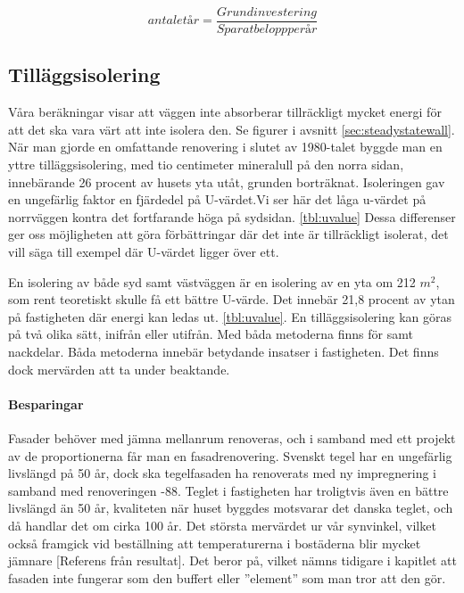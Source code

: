 \begin{equation}
antalet år=\frac{Grundinvestering}{Sparat belopp per år}
\end{equation}

\subsection{Tilläggsisolering}
Våra beräkningar visar att väggen inte absorberar tillräckligt mycket energi för att det ska vara värt att inte isolera den. Se figurer i avsnitt \ref{sec:steadystatewall}.
När man gjorde en omfattande renovering i slutet av 1980-talet byggde man en yttre tilläggsisolering, med tio centimeter mineralull på den norra sidan, \cite{arsredovisning} innebärande 26 procent av husets yta utåt, grunden borträknat. Isoleringen gav en ungefärlig faktor en fjärdedel på U-värdet.Vi ser här det låga u-värdet på norrväggen kontra det fortfarande höga på sydsidan. \ref{tbl:uvalue} Dessa differenser ger oss möjligheten att göra förbättringar där det inte är tillräckligt isolerat, det vill säga till exempel där U-värdet ligger över ett.

En isolering av både syd samt västväggen är en isolering av en yta om 212 $\unit{m^2}$, som rent teoretiskt skulle få ett bättre U-värde. Det innebär 21,8 procent av ytan på fastigheten där energi kan ledas ut. \ref{tbl:uvalue}.
En tilläggsisolering kan göras på två olika sätt, inifrån eller utifrån. Med båda metoderna finns för samt nackdelar. Båda metoderna innebär betydande insatser i fastigheten. Det finns dock mervärden att ta under beaktande. 

\paragraph{Besparingar}
Fasader behöver med jämna mellanrum renoveras, och i samband med ett projekt av de proportionerna får man en fasadrenovering. Svenskt tegel har en ungefärlig livslängd på 50 år\cite{magnus}, dock ska tegelfasaden ha renoverats med ny impregnering i samband med renoveringen -88. Teglet i fastigheten har troligtvis även en bättre livslängd än 50 år, kvaliteten när huset byggdes motsvarar det danska teglet, och då handlar det om cirka 100 år. Det största mervärdet ur vår synvinkel, vilket också framgick vid beställning att temperaturerna i bostäderna blir mycket jämnare [Referens från resultat]. Det beror på, vilket nämns tidigare i kapitlet att fasaden inte fungerar som den buffert eller ”element” som man tror att den gör.

